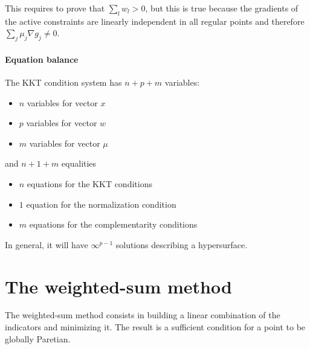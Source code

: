This requires to prove that $\sum_l w_l > 0$, but this is true because the gradients of the active constraints are linearly independent in all regular points and therefore $\sum_j \mu_j \nabla g_j \neq 0$.

\paragraph{Equation balance} The KKT condition system has $n+p+m$ variables: 
\begin{itemize}
	\item $n$ variables for vector $x$
	
	\item $p$ variables for vector $w$
	
	\item $m$ variables for vector $\mu$
\end{itemize}
and $n+1+m$ equalities
\begin{itemize}
	\item $n$ equations for the KKT conditions
	
	\item $1$ equation for the normalization condition
	
	\item $m$ equations for the complementarity conditions
\end{itemize}

In general, it will have $\infty^{p-1}$ solutions describing a hypersurface.


\section{The weighted-sum method}
\label{sec:weightedsum}

The weighted-sum method consists in building a linear combination of the indicators and minimizing it. The result is a sufficient condition for a point to be globally Paretian. \\


